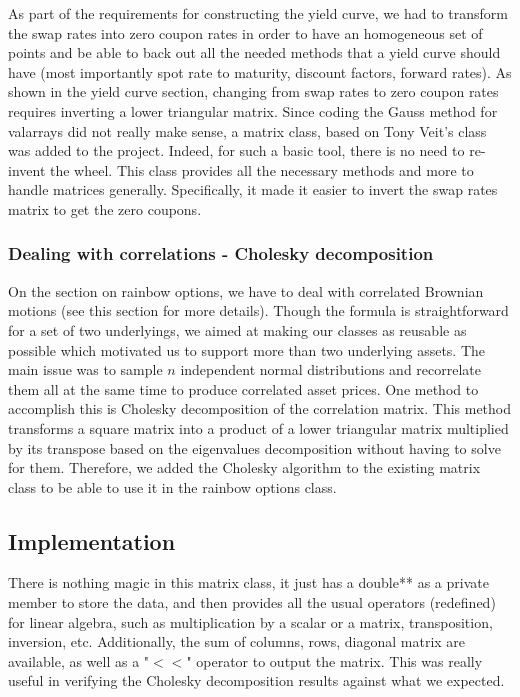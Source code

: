 As part of the requirements for constructing the yield curve, we had to transform the swap rates into zero coupon rates in order to have an homogeneous set of points and be able to back out all the needed methods that a yield curve should have (most importantly spot rate to maturity, discount factors, forward rates). As shown in the yield curve section, changing from swap rates to zero coupon rates requires inverting a lower triangular matrix. Since coding the Gauss method for valarrays did not really make sense, a matrix class, based on Tony Veit's class was added to the project. Indeed, for such a basic tool, there is no need to re-invent the wheel. This class provides all the necessary methods and more to handle matrices generally.  Specifically, it made it easier to invert the swap rates matrix to get the zero coupons.

\subsubsection{Dealing with correlations - Cholesky decomposition}

On the section on rainbow options, we have to deal with correlated Brownian motions (see this section for more details). Though the formula is straightforward for a set of two underlyings, we aimed at making our classes as reusable as possible which motivated us to support more than two underlying assets.  The main issue was to sample $n$ independent normal distributions and recorrelate them all at the same time to produce correlated asset prices. One method to accomplish this is Cholesky decomposition of the correlation matrix. This method transforms a square matrix into a product of a lower triangular matrix multiplied by its transpose based on the eigenvalues decomposition without having to solve for them. Therefore, we added the Cholesky algorithm to the existing matrix class to be able to use it in the rainbow options class.


\subsection{Implementation}

There is nothing magic in this matrix class, it just has a double** as a private member to store the data, and then provides all the usual operators (redefined) for linear algebra, such as multiplication by a scalar or a matrix, transposition, inversion, etc. Additionally, the sum of columns, rows, diagonal matrix are available, as well as a "$<<$" operator to output the matrix. This was really useful in verifying the Cholesky decomposition results against what we expected.


